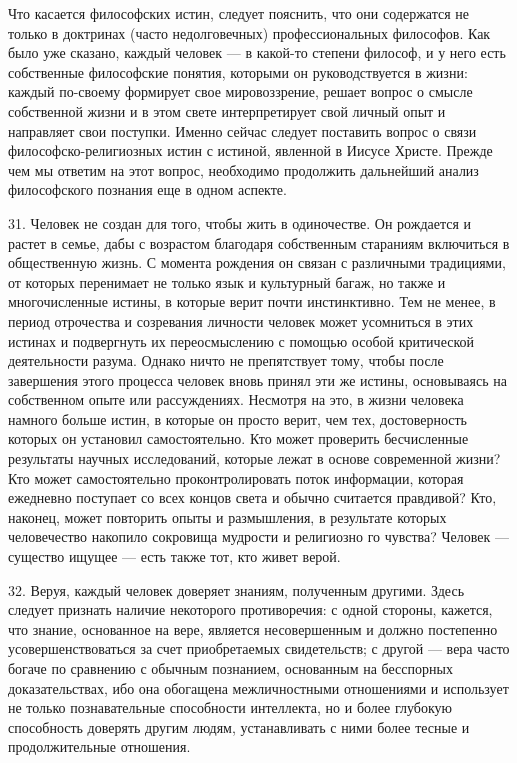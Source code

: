 \documentclass[a5paper,10pt]{article}
\begin{document}
Что касается философских истин, следует пояснить, что они содержатся не только
в доктринах (часто недолговечных) профессиональных философов. Как было уже
сказано, каждый человек — в какой-то степени философ, и у него есть собственные
философские понятия, которыми он руководствуется в жизни: каждый по-своему
формирует свое мировоззрение, решает вопрос о смысле собственной жизни и в этом
свете интерпретирует свой личный опыт и направляет свои поступки. Именно сейчас
следует поставить вопрос о связи философско-религиозных истин с истиной,
явленной в Иисусе Христе. Прежде чем мы ответим на этот вопрос, необходимо
продолжить дальнейший анализ философского познания еще в одном аспекте.

31. Человек не создан для того, чтобы жить в одиночестве. Он рождается и растет
в семье, дабы с возрастом благодаря собственным стараниям включиться в
общественную жизнь. С момента рождения он связан с различными традициями, от
которых перенимает не только язык и культурный багаж, но также и многочисленные
истины, в которые верит почти инстинктивно. Тем не менее, в период отрочества и
созревания личности человек может усомниться в этих истинах и подвергнуть их
переосмыслению с помощью особой критической деятельности разума. Однако ничто
не препятствует тому, чтобы после завершения этого процесса человек вновь
принял эти же истины, основываясь на собственном опыте или рассуждениях.
Несмотря на это, в жизни человека намного больше истин, в которые он просто
верит, чем тех, достоверность которых он установил самостоятельно. Кто может
проверить бесчисленные результаты научных исследований, которые лежат в основе
современной жизни? Кто может самостоятельно проконтролировать поток информации,
которая ежедневно поступает со всех концов света и обычно считается правдивой?
Кто, наконец, может повторить опыты и размышления, в результате которых
человечество накопило сокровища мудрости и религиозно го чувства? Человек — существо ищущее — есть также тот, кто живет верой.

32. Веруя, каждый человек доверяет знаниям, полученным другими. Здесь следует
признать наличие некоторого противоречия: с одной стороны, кажется, что знание,
основанное на вере, является несовершенным и должно постепенно
усовершенствоваться за счет приобретаемых свидетельств; с другой — вера часто
богаче по сравнению с обычным познанием, основанным на бесспорных
доказательствах, ибо она обогащена межличностными отношениями и использует не
только познавательные способности интеллекта, но и более глубокую способность
доверять другим людям, устанавливать с ними более тесные и продолжительные
отношения.
\end{document}
